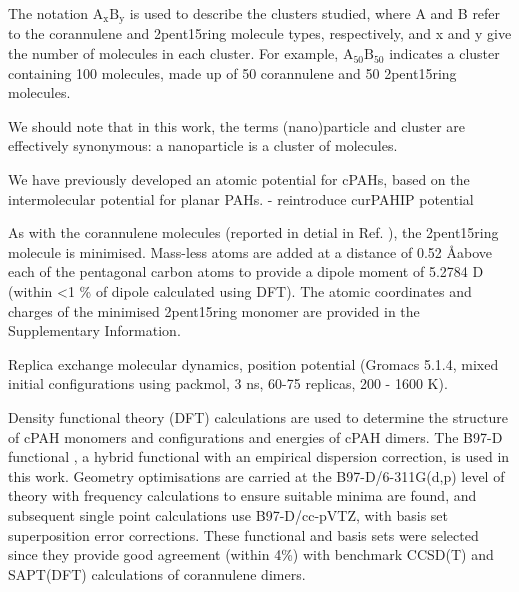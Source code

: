 The notation $\text{A}_{\text{x}}\text{B}_{\text{y}}$ is used to describe the clusters studied, where A and B refer to the corannulene and 2pent15ring molecule types, respectively, and x and y give the number of molecules in each cluster. For example, $\text{A}_{\text{50}}\text{B}_{\text{50}}$ indicates a cluster containing 100 molecules, made up of 50 corannulene and 50 2pent15ring molecules.  

We should note that in this work, the terms (nano)particle and cluster are effectively synonymous: a nanoparticle is a cluster of molecules.

We have previously developed an atomic potential for cPAHs, based on the intermolecular potential for planar PAHs. 
- reintroduce curPAHIP potential

As with the corannulene molecules (reported in detial in Ref. \cite{bowal2019ion}), the 2pent15ring molecule is minimised. Mass-less atoms are added at a distance of 0.52 \AA above each of the pentagonal carbon atoms to provide a dipole moment of 5.2784 D (within <1 \% of dipole calculated using DFT). The atomic coordinates and charges of the minimised 2pent15ring monomer are provided in the Supplementary Information.

Replica exchange molecular dynamics, position potential (Gromacs 5.1.4, mixed initial configurations using packmol, 3 ns, 60-75 replicas, 200 - 1600 K).

Density functional theory (DFT) calculations are used to determine the structure of cPAH monomers and configurations and energies of cPAH dimers. The B97-D functional \cite{grimme2006semiempirical}, a hybrid functional with an empirical dispersion correction, is used in this work.  Geometry optimisations are carried at the B97-D/6-311G(d,p) level of theory with frequency calculations to ensure suitable minima are found, and subsequent single point calculations use B97-D/cc-pVTZ, with basis set superposition error corrections.  These functional and basis sets were selected since they provide good agreement (within 4\%) with benchmark CCSD(T) \cite{janowski2011convex} and SAPT(DFT) \cite{Cabaleiro-Lago2018} calculations of corannulene dimers. %

